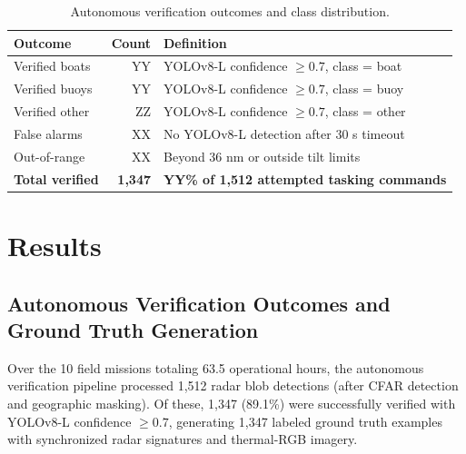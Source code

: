 \documentclass[twocolumn, 10pt]{article}
\begin{document}
\begin{table}[t]
\caption{Autonomous verification outcomes and class distribution.}
\label{tab:verification_outcomes}
\centering
\small
\begin{tabular}{@{}lrp{3cm}@{}}
\toprule
Outcome & Count & Definition \\
\midrule
Verified boats & YY & YOLOv8-L confidence $\geq 0.7$, class = boat \\
\midrule
Verified buoys & YY & YOLOv8-L confidence $\geq 0.7$, class = buoy \\
\midrule
Verified other & ZZ & YOLOv8-L confidence $\geq 0.7$, class = other \\
\midrule
False alarms & XX & No YOLOv8-L detection after 30 s timeout \\
\midrule
Out-of-range & XX & Beyond 36 nm or outside tilt limits \\
\midrule
\textbf{Total verified} & \textbf{1,347} & \textbf{YY\% of 1,512 attempted tasking commands} \\
\bottomrule
\end{tabular}
\end{table}

\section{Results}

\subsection{Autonomous Verification Outcomes and Ground Truth Generation}

Over the 10 field missions totaling 63.5 operational hours, the autonomous verification pipeline processed 1,512 radar blob detections (after CFAR detection and geographic masking). Of these, 1,347 (89.1\%) were successfully verified with YOLOv8-L confidence $\geq 0.7$, generating 1,347 labeled ground truth examples with synchronized radar signatures and thermal-RGB imagery.
\end{document}
